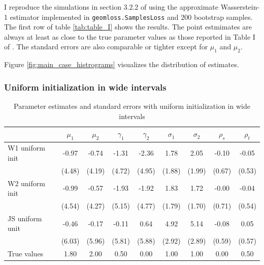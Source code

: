 I reproduce the simulations in section 3.2.2 of \textcite{kaji2023adversarial} using the approximate Wasserstein-1 estimator implemented in \texttt{geomloss.SamplesLoss} and 200 bootstrap samples.
The first row of table \ref{tab:table_I} shows the results.
The point estmimates are always at least as close to the true parameter values as those reported in Table I of \cite{kaji2023adversarial}.
The standard errors are also comparable or tighter except for $\mu_1$ and $\mu_2$.

Figure \ref{fig:main_case_histrograms} visualizes the distribution of estimates.

\subsubsection{Uniform initialization in wide intervals}

\begin{table}
    \centering
    \begin{tabular}{lcccccccc} %
    \toprule
    & $\mu_1$ & $\mu_2$ & $\gamma_1$ & $\gamma_2$ & $\sigma_1$ & $\sigma_2$ & $\rho_s$ & $\rho_t$ \\
    \midrule
    W1 uniform init & -0.97 & -0.74 & -1.31 & -2.36 & 1.78 & 2.05 & -0.10 & -0.05 \\
    & (4.48) & (4.19) & (4.72) & (4.95) & (1.88) & (1.99) & (0.67) & (0.53) \\
    \midrule
    W2 uniform init & -0.99 & -0.57 & -1.93 & -1.92 & 1.83 & 1.72 & -0.00 & -0.04 \\
    & (4.54) & (4.27) & (5.15) & (4.77) & (1.79) & (1.70) & (0.71) & (0.54) \\
    \midrule
    JS uniform unit & -0.46 & -0.17 & -0.11 & 0.64 & 4.92 & 5.14 & -0.08 & 0.05 \\
    & (6.03) & (5.96) & (5.81) & (5.88) & (2.92) & (2.89) & (0.59) & (0.57) \\
    \midrule
    True values & 1.80 & 2.00 & 0.50 & 0.00 & 1.00 & 1.00 & 0.00 & 0.50 \\ 
    \bottomrule
    \end{tabular}
    \caption{Parameter estimates and standard errors with uniform initialization in wide intervals}
    \label{tab:parameter_estimates}
\end{table}

